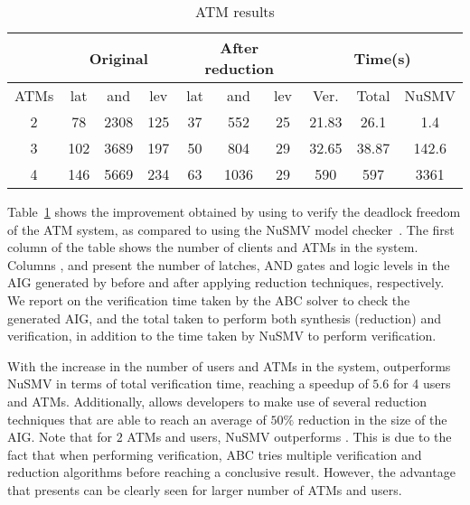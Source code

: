 \begin{table}[tb]
\caption{ATM results}
\centering
\begin{tabular}{|c|c|c|c|c|c|c|c|c|c|}
\cline {2-10}
\multicolumn{1}{c|}{} &  \multicolumn{3}{c|}{Original} & \multicolumn{3}{c|}{After reduction} &  \multicolumn{3}{c|}{Time(s)} \\ \hline
ATMs & lat & and & lev & lat & and & lev & Ver. & Total& NuSMV \\ \hline
2 & 78 & 2308 & 125 & 37 & 552 & 25 & 21.83 & 26.1 & 1.4\\ \hline
3 & 102 & 3689 & 197 & 50 & 804 & 29 & 32.65 & 38.87 & 142.6 \\ \hline
4 & 146 & 5669 & 234 & 63 & 1036 & 29 & 590  & 597 & 3361 \\ \hline
\end{tabular}
\label{tb:bip:atm}
\end{table}

Table~\ref{tb:bip:atm} shows the improvement obtained by using \biptool{}
to verify the deadlock freedom of the ATM system, as compared to using the
NuSMV model checker~\cite{nusmv}.
The first column of the table shows the number of clients and ATMs in the system.
Columns ,  and  present the number 
of latches, AND gates and logic levels in the AIG generated by \biptool{} before
and after applying reduction techniques, respectively.
We report on the verification time taken by the ABC solver to check the 
generated AIG, and the total taken to perform both synthesis (reduction) 
and verification, in addition to the time taken by NuSMV to perform verification.

With the increase in the number of users and ATMs in the system, \biptool{}  
outperforms NuSMV in terms of total verification time, reaching a speedup 
of $5.6$ for 4 users and ATMs. Additionally, \biptool{} allows developers
to make use of several reduction techniques that are able to reach an 
average of $50\%$ reduction in the size of the AIG. Note that for $2$ ATMs 
and users, NuSMV outperforms \biptool{}. This is due to the fact that when 
performing verification, ABC tries multiple verification and reduction 
algorithms before reaching a conclusive result. However, the advantage 
that \biptool{} presents can be clearly seen for larger number of ATMs and 
users. 